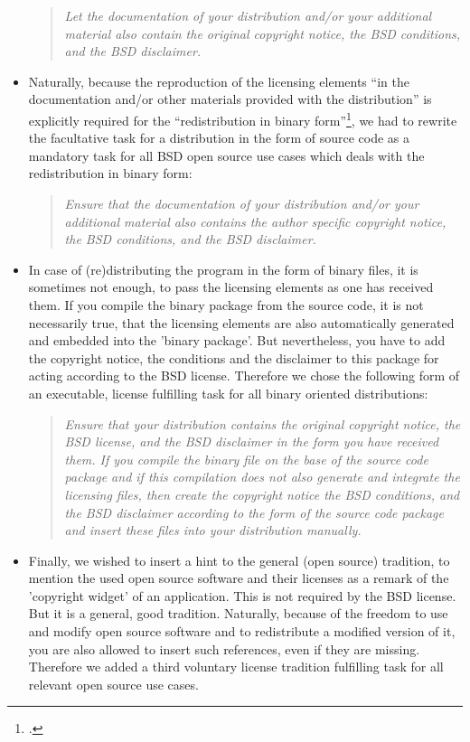 \begin{itemize}
\begin{quote}\textit{Let the documentation of your distribution and/or your
additional material also contain the original copyright notice, the BSD
conditions, and the BSD disclaimer.}\end{quote}

\item Naturally, because the reproduction of the licensing elements \enquote{in
the documentation and/or other materials provided with the distribution}
is explicitly required for the \enquote{redistribution in binary
form}\footcite[cf.][\nopage wp]{BsdLicense2Clause}, we had to rewrite the
facultative task for a distribution in the form of source code as a mandatory task
for all BSD open source use cases which deals with the redistribution in binary
form:

\begin{quote}\textit{Ensure that the documentation of your distribution and/or
your additional material also contains the author specific copyright notice, the
BSD conditions, and the BSD disclaimer.}\end{quote}

\item In case of (re)distributing the program in the form of binary files, it is
sometimes not enough, to pass the licensing elements as one has received them.
If you compile the binary package from the source code, it is not necessarily
true, that the licensing elements are also automatically generated and embedded
into the 'binary package'. But nevertheless, you have to add the copyright
notice, the conditions and the disclaimer to this package for acting according
to the BSD license. Therefore we chose the following form of an executable,
license fulfilling task for all binary oriented distributions:

\begin{quote}\textit{Ensure that your distribution contains the original
copyright notice, the BSD license, and the BSD disclaimer in the form you have
received them. If you compile the binary file on the base of the source code
package and if this compilation does not also generate and integrate the
licensing files, then create the copyright notice the BSD conditions, and the
BSD disclaimer according to the form of the source code package and insert these
files into your distribution manually.}\end{quote}

\item Finally, we wished to insert a hint to the general (open source)
tradition, to mention the used open source software and their licenses as a
remark of the 'copyright widget' of an application. This is not required by the
BSD license. But it is a general, good tradition. Naturally, because of the
freedom to use and modify open source software and to redistribute a modified
version of it, you are also allowed to insert such references, even if they are
missing. Therefore we added a third voluntary license tradition fulfilling
task for all relevant open source use cases.

\end{itemize}




%
